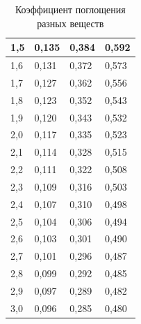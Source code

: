 \documentclass[a4paper]{article}
\begin{document}
\begin{table}[H]
\begin{center}
\begin{tabular}{|l|l|l|l|}
    1,5                                        & 0,135           & 0,384          & 0,592           \\ \hline
    1,6                                        & 0,131           & 0,372          & 0,573           \\ \hline
    1,7                                        & 0,127           & 0,362          & 0,556           \\ \hline
    1,8                                        & 0,123           & 0,352          & 0,543           \\ \hline
    1,9                                        & 0,120           & 0,343          & 0,532           \\ \hline
    2,0                                        & 0,117           & 0,335          & 0,523           \\ \hline
    2,1                                        & 0,114           & 0,328          & 0,515           \\ \hline
    2,2                                        & 0,111           & 0,322          & 0,508           \\ \hline
    2,3                                        & 0,109           & 0,316          & 0,503           \\ \hline
    2,4                                        & 0,107           & 0,310          & 0,498           \\ \hline
    2,5                                        & 0,104           & 0,306          & 0,494           \\ \hline
    2,6                                        & 0,103           & 0,301          & 0,490           \\ \hline
    2,7                                        & 0,101           & 0,296          & 0,487           \\ \hline
    2,8                                        & 0,099           & 0,292          & 0,485           \\ \hline
    2,9                                        & 0,097           & 0,289          & 0,482           \\ \hline
    3,0                                        & 0,096           & 0,285          & 0,480           \\ \hline
    \end{tabular}
    \caption{Коэффициент поглощения разных веществ}
    \end{center}
    \end{table}
\end{document}
